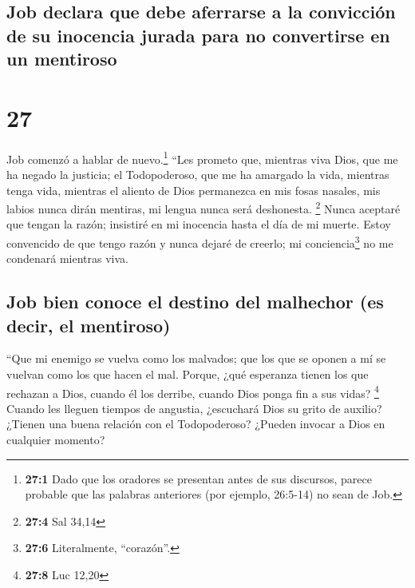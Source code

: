 \hypertarget{job-declara-que-debe-aferrarse-a-la-convicciuxf3n-de-su-inocencia-jurada-para-no-convertirse-en-un-mentiroso}{%
\subsection{Job declara que debe aferrarse a la convicción de su
inocencia jurada para no convertirse en un
mentiroso}\label{job-declara-que-debe-aferrarse-a-la-convicciuxf3n-de-su-inocencia-jurada-para-no-convertirse-en-un-mentiroso}}

\hypertarget{section-26}{%
\section{27}\label{section-26}}

 Job comenzó a hablar de nuevo.\footnote{\textbf{27:1}
  Dado que los oradores se presentan antes de sus discursos, parece
  probable que las palabras anteriores (por ejemplo, 26:5-14) no sean de
  Job.}  ``Les prometo que, mientras viva Dios, que me ha
negado la justicia; el Todopoderoso, que me ha amargado la vida,
 mientras tenga vida, mientras el aliento de Dios
permanezca en mis fosas nasales,  mis labios nunca dirán
mentiras, mi lengua nunca será deshonesta. \footnote{\textbf{27:4} Sal
  34,14}  Nunca aceptaré que tengan la razón; insistiré en
mi inocencia hasta el día de mi muerte.  Estoy convencido
de que tengo razón y nunca dejaré de creerlo; mi conciencia\footnote{\textbf{27:6}
  Literalmente, ``corazón''.} no me condenará mientras viva.

\hypertarget{job-bien-conoce-el-destino-del-malhechor-es-decir-el-mentiroso}{%
\subsection{Job bien conoce el destino del malhechor (es decir, el
mentiroso)}\label{job-bien-conoce-el-destino-del-malhechor-es-decir-el-mentiroso}}

 ``Que mi enemigo se vuelva como los malvados; que los que
se oponen a mí se vuelvan como los que hacen el mal. 
Porque, ¿qué esperanza tienen los que rechazan a Dios, cuando él los
derribe, cuando Dios ponga fin a sus vidas? \footnote{\textbf{27:8} Luc
  12,20}  Cuando les lleguen tiempos de angustia,
¿escuchará Dios su grito de auxilio?  ¿Tienen una buena
relación con el Todopoderoso? ¿Pueden invocar a Dios en cualquier
momento?

